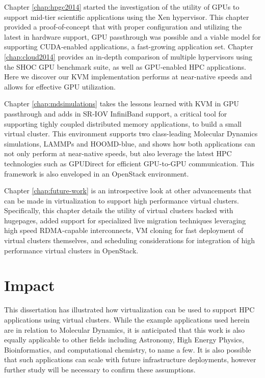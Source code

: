Chapter \ref{chap:hpgc2014} started the investigation of the utility of GPUs to support mid-tier scientific applications using the Xen hypervisor. This chapter provided a proof-of-concept that with proper configuration and utilizing the latest in hardware support, GPU passthrough was possible and a viable model for supporting CUDA-enabled applications, a fast-growing application set. Chapter \ref{chap:cloud2014} provides an in-depth comparison of multiple hypervisors using the SHOC GPU benchmark suite, as well as GPU-enabled HPC applications. Here we discover our KVM implementation performs at near-native speeds and allows for effective GPU utilization. 

Chapter \ref{chap:mdsimulations} takes the lessons learned with KVM in GPU passthrough and adds in SR-IOV InfiniBand support, a critical tool for supporting tighly coupled distributed memory applications, to build a small virtual cluster. This environment supports two class-leading Molecular Dynamics simulations, LAMMPs and HOOMD-blue, and shows how both applications can not only perform at near-native speeds, but also leverage the latest HPC technologies such as GPUDirect for efficient GPU-to-GPU communication. This framework is also enveloped in an OpenStack environment.     

Chapter \ref{chap:future-work} is an introspective look at other advancements that can be made in virtualization to support high performance virtual clusters. Specifically, this chapter details the utility of virtual clusters backed with hugepages, added support for specialized live migration techniques leveraging high speed RDMA-capable interconnects, VM cloning for fast deployment of virtual clusters themselves, and scheduling considerations for integration of high performance virtual clusters in OpenStack.  




\section{Impact}
\label{sec:impact}

This dissertation has illustrated how virtualization can be used to support HPC applications using virtual clusters.  While the example applications used herein are in relation to Molecular Dynamics, it is anticipated that this work is also equally applicable to other fields including Astronomy, High Energy Physics, Bioinformatics, and computational chemistry, to name a few. It is also possible that such applications can scale with future infrastructure deployments, however further study will be necessary to confirm these assumptions.

